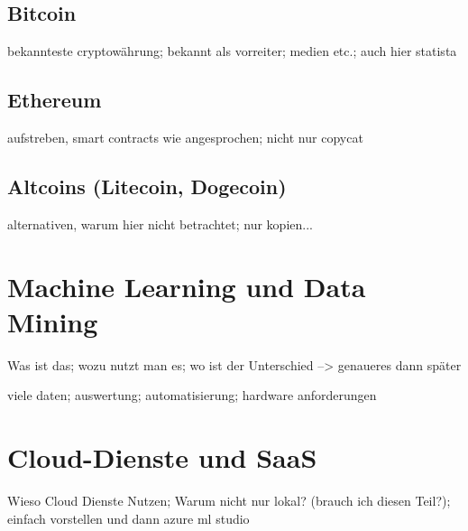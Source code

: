 \subsection{Bitcoin}\label{subsec:Bitcoin}

bekannteste cryptowährung; bekannt als vorreiter; medien etc.; auch hier statista


\subsection{Ethereum}\label{subsec:Ethereum}
aufstreben, smart contracts wie angesprochen; nicht nur copycat


\subsection{Altcoins (Litecoin, Dogecoin)}\label{subsec:Altcoins}
alternativen, warum hier nicht betrachtet; nur kopien...




\section{Machine Learning und Data Mining}


Was ist das; wozu nutzt man es; wo ist der Unterschied --> genaueres dann später

viele daten; auswertung; automatisierung; hardware anforderungen


\section{Cloud-Dienste und SaaS}
Wieso Cloud Dienste Nutzen; Warum nicht nur lokal? (brauch ich diesen Teil?); einfach vorstellen und dann azure ml studio